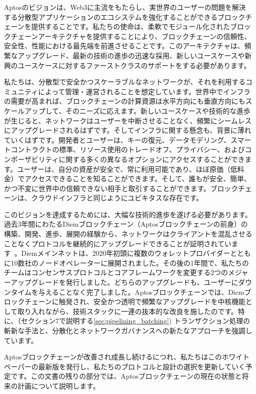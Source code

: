 \documentclass{article}
\begin{document}
Aptosのビジョンは、Web3に主流をもたらし、実世界のユーザーの問題を解決する分散型アプリケーションのエコシステムを強化することができるブロックチェーンを提供することです。私たちの使命は、柔軟でモジュール化されたブロックチェーンアーキテクチャを提供することにより、ブロックチェーンの信頼性、安全性、性能における最先端を前進させることです。このアーキテクチャは、頻繁なアップグレード、最新の技術の進歩の迅速な採用、新しいユースケースや新興のユースケースに対するファーストクラスのサポートをする必要があります。

私たちは、分散型で安全かつスケーラブルなネットワークが、それを利用するコミュニティによって管理・運営されることを想定しています。世界中でインフラの需要が高まれば、ブロックチェーンの計算資源は水平方向にも垂直方向にもスケールアップして、そのニーズに応えます。新しいユースケースや技術的な進歩が生じると、ネットワークはユーザーを中断させることなく、頻繁にシームレスにアップグレードされるはずです。そしてインフラに関する懸念も、背景に薄れていくはずです。開発者とユーザーは、キーの復元、データモデリング、スマートコントラクトの標準、リソース使用のトレードオフ、プライバシー、およびコンポーザビリティに関する多くの異なるオプションにアクセスすることができます。ユーザーは、自分の資産が安全で、常に利用可能であり、ほぼ原価（低料金）でアクセスできることを知ることができます。そして、誰もが安全、簡単、かつ不変に世界中の信頼できない相手と取引することができます。ブロックチェーンは、クラウドインフラと同じようにユビキタスな存在です。

このビジョンを達成するためには、大幅な技術的進歩を遂げる必要があります。過去3年間にわたるDiemブロックチェーン（Aptosブロックチェーンの前身）の構築、開発、進歩、展開の経験から、ネットワークはクライアントを混乱させることなくプロトコルを継続的にアップグレードできることが証明されています~\cite{diem_blockchain}。Diemメインネットは、2020年初頭に複数のウォレットプロバイダーとともに10数社のノードオペレーターに展開されました。その後の1年間で、私たちのチームはコンセンサスプロトコルとコアフレームワークを変更する2つのメジャーアップグレードを発行しました。どちらのアップグレードも、ユーザーにダウンタイムを与えることなく完了しました。Aptosブロックチェーンでは、Diemブロックチェーンに触発され、安全かつ透明で頻繁なアップグレードを中核機能として取り入れながら、技術スタックに一連の抜本的な改良を施したのです。特に、（セクション7で説明する\ref{sec:pipelining_batching}) トランザクション処理の斬新な手法と、分散化とネットワークガバナンスへの新たなアプローチを強調しています。

Aptosブロックチェーンが改善され成長し続けるにつれ、私たちはこのホワイトペーパーの最新版を発行し、私たちのプロトコルと設計の選択を更新していく予定です。この文書の残りの部分では、Aptosブロックチェーンの現在の状態と将来の計画について説明します。
\end{document}

